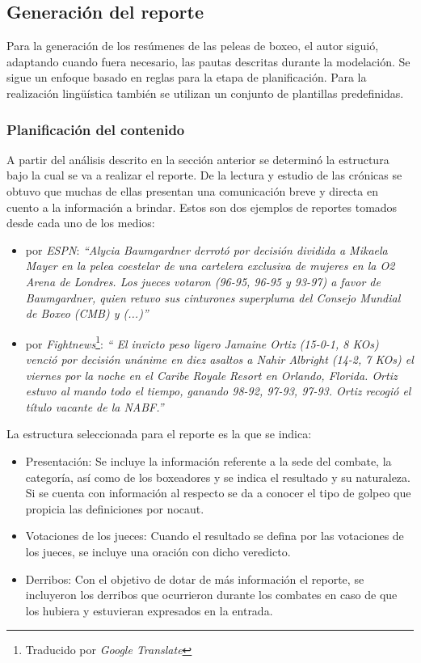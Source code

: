 \subsection{Generación del reporte}

    Para la generación de los resúmenes de las peleas de boxeo, el autor siguió, adaptando cuando fuera necesario, las pautas descritas durante la 
modelación. Se sigue un enfoque basado en reglas para la etapa de planificación. Para la realización lingüística también se utilizan un conjunto de 
plantillas predefinidas.

\subsubsection{Planificación del contenido}

A partir del análisis descrito en la sección anterior se determinó la estructura bajo la cual se va a realizar el reporte. De la lectura y estudio de 
las crónicas se obtuvo que muchas de ellas presentan una comunicación breve y directa en cuento a la información a brindar. Estos son dos ejemplos de 
reportes tomados desde cada uno de los medios:

    \begin{itemize}
        \item por \textit{ESPN}: \textit{“Alycia Baumgardner derrotó por decisión dividida a Mikaela Mayer en la pelea coestelar de una cartelera exclusiva de mujeres en la O2 Arena de Londres. 
        Los jueces votaron (96-95, 96-95 y 93-97) a favor de Baumgardner, quien retuvo sus cinturones superpluma del Consejo Mundial de Boxeo (CMB) y (...)”}
        \item por \textit{Fightnews}\footnote[1]{Traducido por \textit{Google Translate}}: \textit{“ El invicto peso ligero Jamaine Ortiz (15-0-1, 8 KOs) venció por decisión unánime en diez asaltos a Nahir Albright (14-2, 7 KOs) 
        el viernes por la noche en el Caribe Royale Resort en Orlando, Florida. Ortiz estuvo al mando todo el tiempo, ganando 98-92, 97-93, 97-93. Ortiz recogió el título vacante de la NABF.”}
    \end{itemize}

    La estructura seleccionada para el reporte es la que se indica:
    \begin{itemize}
        \item  Presentación: Se incluye la información referente a la sede del combate, la categoría, así como de los boxeadores y se indica el resultado y su naturaleza. Si se cuenta 
        con información al respecto se da a conocer el tipo de golpeo que propicia las definiciones por nocaut.
        \item Votaciones de los jueces: Cuando el resultado se defina por las votaciones de los jueces, se incluye una oración con dicho veredicto.
        \item Derribos: Con el objetivo de dotar de más información el reporte, se incluyeron los derribos que ocurrieron durante los combates en caso de que 
        los hubiera y estuvieran expresados en la entrada.
    \end{itemize}


